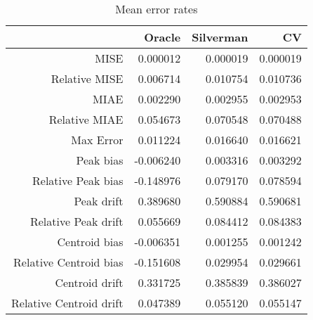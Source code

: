 \begin{table}[ht]
\centering
\begin{tabular}{rrrr}
  \hline
 & Oracle & Silverman & CV \\ 
  \hline
MISE & 0.000012 & 0.000019 & 0.000019 \\ 
  Relative MISE & 0.006714 & 0.010754 & 0.010736 \\ 
  MIAE & 0.002290 & 0.002955 & 0.002953 \\ 
  Relative MIAE & 0.054673 & 0.070548 & 0.070488 \\ 
  Max Error & 0.011224 & 0.016640 & 0.016621 \\ 
  Peak bias & -0.006240 & 0.003316 & 0.003292 \\ 
  Relative Peak bias & -0.148976 & 0.079170 & 0.078594 \\ 
  Peak drift & 0.389680 & 0.590884 & 0.590681 \\ 
  Relative Peak drift & 0.055669 & 0.084412 & 0.084383 \\ 
  Centroid bias & -0.006351 & 0.001255 & 0.001242 \\ 
  Relative Centroid bias & -0.151608 & 0.029954 & 0.029661 \\ 
  Centroid drift & 0.331725 & 0.385839 & 0.386027 \\ 
  Relative Centroid drift & 0.047389 & 0.055120 & 0.055147 \\ 
   \hline
\end{tabular}
\caption{Mean error rates} 
\label{tbl:mean_error_rates}
\end{table}
